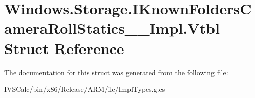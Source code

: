 \hypertarget{struct_windows_1_1_storage_1_1_i_known_folders_camera_roll_statics_____impl_1_1_vtbl}{}\section{Windows.\+Storage.\+I\+Known\+Folders\+Camera\+Roll\+Statics\+\_\+\+\_\+\+Impl.\+Vtbl Struct Reference}
\label{struct_windows_1_1_storage_1_1_i_known_folders_camera_roll_statics_____impl_1_1_vtbl}


The documentation for this struct was generated from the following file\+:\begin{DoxyCompactItemize}
\item 
I\+V\+S\+Calc/bin/x86/\+Release/\+A\+R\+M/ilc/Impl\+Types.\+g.\+cs\end{DoxyCompactItemize}
